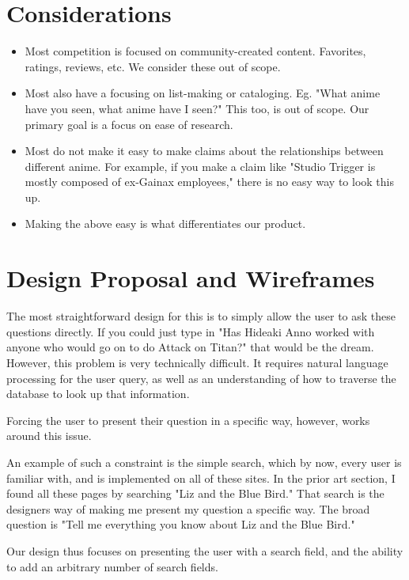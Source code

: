 \documentclass[a4paper]{article}
\begin{document}
\section{Considerations}
\begin{itemize}
  \item Most competition is focused on community-created content. Favorites, ratings, reviews, etc. We consider these out of scope.
  \item Most also have a focusing on list-making or cataloging. Eg. "What anime have you seen, what anime have I seen?" This too, is out of scope. Our primary goal is a focus on ease of research.
  \item Most do not make it easy to make claims about the relationships between different anime. For example, if you make a claim like "Studio Trigger is mostly composed of ex-Gainax employees," there is no easy way to look this up. 
  \item Making the above easy is what differentiates our product.
\end{itemize}

\section{Design Proposal and Wireframes}

The most straightforward design for this is to simply allow the user to ask these questions directly. If you could just type in "Has Hideaki Anno worked with anyone who would go on to do Attack on Titan?" that would be the dream. However, this problem is very technically difficult. It requires natural language processing for the user query, as well as an understanding of how to traverse the database to look up that information.

Forcing the user to present their question in a specific way, however, works around this issue.

An example of such a constraint is the simple search, which by now, every user is familiar with, and is implemented on all of these sites. In the prior art section, I found all these pages by searching "Liz and the Blue Bird." That search is the designers way of making me present my question a specific way. The broad question is "Tell me everything you know about Liz and the Blue Bird."

Our design thus focuses on presenting the user with a search field, and the ability to add an arbitrary number of search fields.
\end{document}

